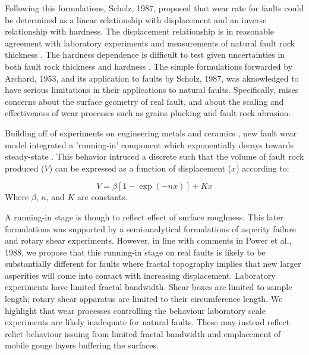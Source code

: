 \documentclass[12pt,a4paper]{article}
\begin{document}
	Following this formulations, Scholz, 1987, proposed that wear rate for faults could be determined as a linear relationship with displacement and an inverse relationship with hardness. The displacement relationship is in reasonable agreement with laboratory experiments \cite{yoshioka1986fracture} and measurements of natural fault rock thickness \cite{robertson1982continuous, shipton2006thick}. The hardness dependence is difficult to test given uncertainties in both fault rock thickness and hardness \cite{scholz1987wear}. The simple formulations forwarded by Archard, 1953, and its application to faults by Scholz, 1987, was aknowledged to have serious limitations in their applications to natural faults. Specifically, \citet{scholz1987wear} raises concerns about the surface geometry of real fault, and about the scaling and effectiveness of wear processes such as grains plucking and fault rock abrasion.

   Building off of experiments on engineering metals \cite{queener1965transient} and ceramics \cite{levy1988unlubricated}, new fault wear model integrated a 'running-in' component which exponentially decays towards steady-state \cite{power1988roughness, wang1994wear}. This behavior intruced a discrete such that the volume of fault rock produced ($V$) can be expressed as a function of displacement ($x$) according to:
   
\begin{equation}
   V = \beta \left[ 1-\exp(-nx)\right] +Kx
\end{equation}
%
Where $\beta$, $n$, and $K$ are constants. 

	A running-in stage is though to reflect effect of surface roughness. This later formulations was supported by a semi-analytical formulations of asperity failure and rotary shear experiments. However, in line with comments in Power et al., 1988, we propose that this running-in stage on real faults is likely to be substantially different for faults where fractal topography implies that new larger asperities will come into contact with increasing displacement. Laboratory experiments have limited fractal bandwidth. Shear boxes are limited to sample length; rotary shear apparatus are limited to their circumference length. We highlight that wear processes controlling the behaviour laboratory scale experiments are likely inadequate for natural faults. These may instead reflect relict behaviour issuing from limited fractal bandwidth and emplacement of mobile gouge layers buffering the surfaces.
   
\end{document}
